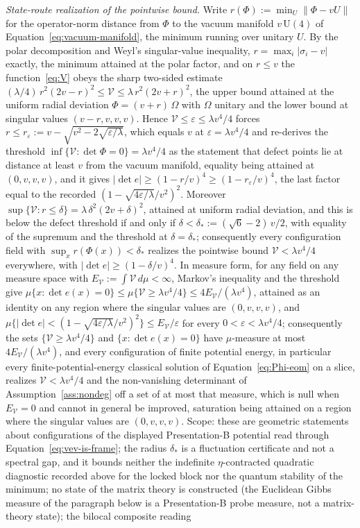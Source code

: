 \emph{State-route realization of the pointwise bound.} Write \(r(\Phi):=\min_{U}\|\Phi-vU\|\) for the operator-norm distance from \(\Phi\) to the vacuum manifold \(v\,\mathrm U(4)\) of Equation~\eqref{eq:vacuum-manifold}, the minimum running over unitary \(U\). By the polar decomposition and Weyl's singular-value inequality, \(r=\max_i|\sigma_i-v|\) exactly, the minimum attained at the polar factor, and on \(r\le v\) the function~\eqref{eq:V} obeys the sharp two-sided estimate \((\lambda/4)\,r^2(2v-r)^2\le\mathcal V\le\lambda\,r^2(2v+r)^2\), the upper bound attained at the uniform radial deviation \(\Phi=(v+r)\,\Omega\) with \(\Omega\) unitary and the lower bound at singular values \((v-r,v,v,v)\). Hence \(\mathcal V\le\varepsilon\le\lambda v^4/4\) forces \(r\le r_\varepsilon:=v-\sqrt{v^2-2\sqrt{\varepsilon/\lambda}}\), which equals \(v\) at \(\varepsilon=\lambda v^4/4\) and re-derives the threshold \(\inf\{\mathcal V:\det\Phi=0\}=\lambda v^4/4\) as the statement that defect points lie at distance at least \(v\) from the vacuum manifold, equality being attained at \((0,v,v,v)\), and it gives \(|\det e|\ge(1-r/v)^4\ge(1-r_\varepsilon/v)^4\), the last factor equal to the recorded \((1-\sqrt{4\varepsilon/\lambda}/v^2)^2\). Moreover \(\sup\{\mathcal V:r\le\delta\}=\lambda\,\delta^2(2v+\delta)^2\), attained at uniform radial deviation, and this is below the defect threshold if and only if \(\delta<\delta_*:=(\sqrt{6}-2)\,v/2\), with equality of the supremum and the threshold at \(\delta=\delta_*\); consequently every configuration field with \(\sup_x r(\Phi(x))<\delta_*\) realizes the pointwise bound \(\mathcal V<\lambda v^4/4\) everywhere, with \(|\det e|\ge(1-\delta/v)^4\). In measure form, for any field on any measure space with \(E_{\mathcal V}:=\int\mathcal V\,d\mu<\infty\), Markov's inequality and the threshold give \(\mu\{x:\det e(x)=0\}\le\mu\{\mathcal V\ge\lambda v^4/4\}\le 4E_{\mathcal V}/(\lambda v^4)\), attained as an identity on any region where the singular values are \((0,v,v,v)\), and \(\mu\{|\det e|<(1-\sqrt{4\varepsilon/\lambda}/v^2)^2\}\le E_{\mathcal V}/\varepsilon\) for every \(0<\varepsilon<\lambda v^4/4\); consequently the sets \(\{\mathcal V\ge\lambda v^4/4\}\) and \(\{x:\det e(x)=0\}\) have \(\mu\)-measure at most \(4E_{\mathcal V}/(\lambda v^4)\), and every configuration of finite potential energy, in particular every finite-potential-energy classical solution of Equation~\eqref{eq:Phi-eom} on a slice, realizes \(\mathcal V<\lambda v^4/4\) and the non-vanishing determinant of Assumption~\ref{ass:nondeg} off a set of at most that measure, which is null when \(E_{\mathcal V}=0\) and cannot in general be improved, saturation being attained on a region where the singular values are \((0,v,v,v)\). Scope: these are geometric statements about configurations of the displayed Presentation-B potential read through Equation~\eqref{eq:vev-is-frame}; the radius \(\delta_*\) is a fluctuation certificate and not a spectral gap, and it bounds neither the indefinite \(\eta\)-contracted quadratic diagnostic recorded above for the locked block nor the quantum stability of the minimum; no state of the matrix theory is constructed (the Euclidean Gibbs measure of the paragraph below is a Presentation-B probe measure, not a matrix-theory state); the bilocal composite reading 
